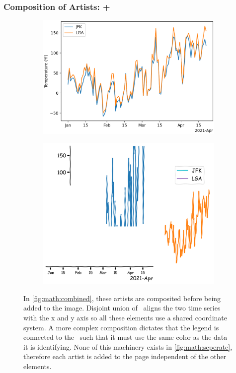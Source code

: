 \documentclass[../main.tex]{subfiles}
\begin{document}
\subsubsection{Composition of Artists: +}
\begin{figure}[H]
\begin{subfigure}{.5\textwidth}
    \includegraphics[width=1\textwidth]{figures/math/combined_artist.png}
    \caption{}
    \label{fig:math:combined}    
\end{subfigure}
\begin{subfigure}{.5\textwidth}
    \includegraphics[width=1\textwidth]{figures/math/exploding_artist.png}
    \caption{}
    \label{fig:math:seperate}
\end{subfigure}
\caption{ In \autoref{fig:math:combined}, these artists are composited before being added to the image. Disjoint union of \dtotal\ aligns the two time series with the x and y axis so all these elements use a shared coordinate system. A more complex composition dictates that the legend is connected to the \dtotal\ such that it must use the same color as the data it is identifying. None of this machinery exists in \autoref{fig:math:seperate}, therefore each artist is added to the page independent of the other elements.}
\label{fig:artist_plus}
\end{figure}
\end{document}
